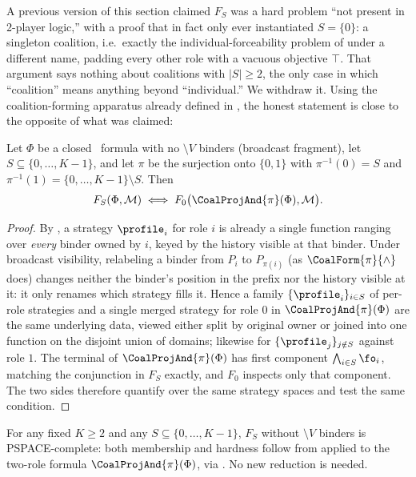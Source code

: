 A previous version of this section claimed $F_S$ was a hard problem ``not
present in 2-player logic,'' with a proof that in fact only ever instantiated
$S=\{0\}$: a singleton coalition, i.e.\ exactly the individual-forceability
problem of  under a different name, padding every other
role with a vacuous objective $\top$. That argument says nothing about
coalitions with $|S|\ge 2$, the only case in which ``coalition'' means
anything beyond ``individual.'' We withdraw it. Using the coalition-forming
apparatus already defined in , the honest statement is
close to the opposite of what was claimed:

\begin{proposition}
\label{prop:coalition-merge-lossless}
Let $\Phi$ be a closed \KFOL\ formula with no $\setminus V$ binders (broadcast
fragment), let $S \subseteq \{0,\dots,K-1\}$, and let $\pi$ be the surjection
onto $\{0,1\}$ with $\pi^{-1}(0)=S$ and $\pi^{-1}(1) = \{0,\dots,K-1\}\setminus
S$. Then
\[
F_S(\Phi, \mathcal M) \iff F_0\bigl(\CoalProjAnd{\pi}(\Phi), \mathcal M\bigr).
\]
\end{proposition}
\begin{proof}
By , a strategy $\profile_i$ for role $i$ is already a
single function ranging over \emph{every} binder owned by $i$, keyed by the
history visible at that binder. Under broadcast visibility, relabeling a
binder from $P_i$ to $P_{\pi(i)}$ (as $\CoalForm{\pi}{\wedge}$ does) changes
neither the binder's position in the prefix nor the history visible at it: it
only renames which strategy fills it. Hence a family $\{\profile_i\}_{i\in
S}$ of per-role strategies and a single merged strategy for role $0$ in
$\CoalProjAnd{\pi}(\Phi)$ are the same underlying data, viewed either split by
original owner or joined into one function on the disjoint union of domains;
likewise for $\{\profile_j\}_{j\notin S}$ against role $1$. The terminal of
$\CoalProjAnd{\pi}(\Phi)$ has first component $\bigwedge_{i\in S}\fo_i$,
matching the conjunction in $F_S$ exactly, and $F_0$ inspects only that
component. The two sides therefore quantify over the same strategy spaces and
test the same condition.
\end{proof}

\begin{corollary}
\label{cor:coalitional-pspace}
For any fixed $K \ge 2$ and any $S \subseteq \{0,\dots,K-1\}$, $F_S$ without
$\setminus V$ binders is PSPACE-complete: both membership and hardness follow
from  applied to the two-role formula
$\CoalProjAnd{\pi}(\Phi)$, via . No new
reduction is needed.
\end{corollary}

